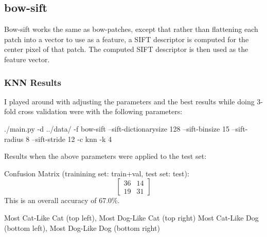 \documentclass[fleqn]{article}
\begin{document}
\subsection{bow-sift}
Bow-sift works the same as bow-patches, except that rather than flattening each patch into a vector to use as a feature, a SIFT descriptor is computed for the center pixel of that patch.  The computed SIFT descriptor is then used as the feature vector.
\subsubsection{KNN Results}
I played around with adjusting the parameters and the best results while doing 3-fold cross validation were with the following parameters:
\begin{solution}
    ./main.py -d ../data/ -f bow-sift --sift-dictionarysize 128 --sift-binsize 15 --sift-radius 8 --sift-stride 12 -c knn -k 4
\end{solution}
Results when the above parameters were applied to the test set:

Confusion Matrix (trainining set: train+val, test set: test):
\[
  \begin{bmatrix}
    36 & 14 \\
    19 & 31
  \end{bmatrix}
\]
This is an overall accuracy of 67.0\%.
\begin{center}
    Most Cat-Like Cat (top left), Most Dog-Like Cat (top right)\break
    Most Cat-Like Dog (bottom left), Most Dog-Like Dog (bottom right)
\end{center}
\end{document}
